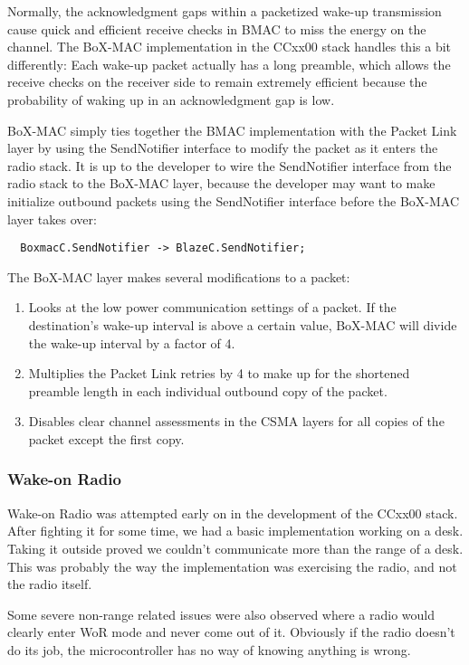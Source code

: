 \documentclass{article}
\begin{document}
Normally, the acknowledgment gaps within a packetized wake-up transmission cause 
quick and efficient receive checks in BMAC to miss the energy on the channel. The
BoX-MAC implementation in the CCxx00 stack handles this a bit differently: Each
wake-up packet actually has a long preamble, which allows the receive checks on the
receiver side to remain extremely efficient because the probability of waking up 
in an acknowledgment gap is low.

BoX-MAC simply ties together the BMAC implementation with the Packet Link layer
by using the SendNotifier interface to modify the packet as it enters the radio
stack. It is up to the developer to wire the SendNotifier interface from the radio stack
to the BoX-MAC layer, because the developer may want to make initialize outbound packets using the
SendNotifier interface before the BoX-MAC layer takes over:

\begin{verbatim}
  BoxmacC.SendNotifier -> BlazeC.SendNotifier;
\end{verbatim}

The BoX-MAC layer makes several modifications to a packet:

\begin{enumerate}
  \item Looks at the low power communication settings of a packet. If the destination's
  wake-up interval is above a certain value, BoX-MAC will divide the wake-up interval
  by a factor of 4.
  \item Multiplies the Packet Link retries by 4 to make up for the shortened preamble
  length in each individual outbound copy of the packet.
  \item Disables clear channel assessments in the CSMA layers for all copies of the
  packet except the first copy.
\end{enumerate} 

\subsubsection{Wake-on Radio}
\label{sec:wor}
Wake-on Radio \cite{cc1101datasheet} was attempted early on in the development of the CCxx00 stack. After
fighting it for some time, we had a basic implementation working on a desk. Taking it
outside proved we couldn't communicate more than the range of a desk. This was probably
the way the implementation was exercising the radio, and not the radio itself.

Some severe non-range related issues were also observed where a radio would clearly 
enter WoR mode and never come out of it. Obviously if the radio doesn't do its job, 
the microcontroller has no way of knowing anything is wrong.
\end{document}
